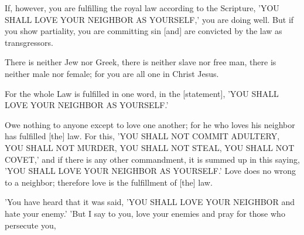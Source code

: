 \begin{scripture}[James 2:8-9]
    If, however, you are fulfilling the royal law according to the Scripture, 'YOU SHALL LOVE YOUR NEIGHBOR AS YOURSELF,' you are doing well.
    But if you show partiality, you are committing sin [and] are convicted by the law as transgressors.
\end{scripture}

\begin{scripture}[Galatians 3:28]
    There is neither Jew nor Greek, there is neither slave nor free man, there is neither male nor female; for you are all one in Christ Jesus.
\end{scripture}

\begin{scripture}[Galatians 5:14]
    For the whole Law is fulfilled in one word, in the [statement], 'YOU SHALL LOVE YOUR NEIGHBOR AS YOURSELF.'
\end{scripture}

\begin{scripture}[Romans 13:8-10]
    Owe nothing to anyone except to love one another; for he who loves his neighbor has fulfilled [the] law.
    For this, 'YOU SHALL NOT COMMIT ADULTERY, YOU SHALL NOT MURDER, YOU SHALL NOT STEAL, YOU SHALL NOT COVET,' and if there is any other commandment, it is summed up in this saying, 'YOU SHALL LOVE YOUR NEIGHBOR AS YOURSELF.'
    Love does no wrong to a neighbor; therefore love is the fulfillment of [the] law.
\end{scripture}

\begin{scripture}[Matthew 5:43-44]
    'You have heard that it was said, 'YOU SHALL LOVE YOUR NEIGHBOR and hate your enemy.'
    'But I say to you, love your enemies and pray for those who persecute you,
\end{scripture}
